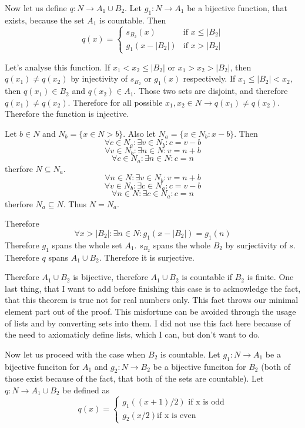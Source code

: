 \documentclass[11pt,oneside,titlepage]{book}
\begin{document}
Now let us define $q: N \to A_1 \cup B_2$. Let $g_1: N \to A_1$ be a bijective
function, that exists, because the set $A_1$ is countable. Then 
\begin{equation}
  q(x)=
  \begin{cases}
    s_{B_2}(x) & \text{if } x \leq |B_2|\\
    g_1(x - |B_2|) & \text{if } x > |B_2|
  \end{cases}
\end{equation}

Let's analyse this function. If $x_1 < x_2 \leq |B_2|$ or $x_1 > x_2 > |B_2|$,
then $q(x_1) \neq q(x_2)$ by injectivity of $s_{B_2}$ or $g_1(x)$ respectively.
If $x_1 \leq |B_2| < x_2$, then $q(x_1) \in B_2$ and $q(x_2) \in A_1$. Those
two sets are disjoint, and therefore $q(x_1) \neq q(x_2)$. Therefore for
all possible $x_1,x_2 \in N \to q(x_1) \neq q(x_2)$. Therefore the function
is injective.

Let $b \in N$ and  $N_b = \{x \in N > b\}$. Also let  $N_a = \{x \in N_b: x -
b\}$. Then
$$\forall c \in N_a: \exists v \in N_b: c = v - b$$
$$\forall v \in N_b: \exists n \in N: v = n + b$$
$$\forall c \in N_a: \exists n \in N: c = n$$
therfore $N \subseteq N_a$.
$$\forall n \in N: \exists v \in N_b: v = n + b$$
$$\forall v \in N_b: \exists c \in N_a: c = v - b$$
$$\forall n \in N: \exists c \in N_a: c = n$$
therfore $N_a \subseteq N$. Thus $N = N_a$.

Therefore
$$\forall x > |B_2|: \exists n \in N: g_1(x - |B_2|) = g_1(n)$$
Therefore $g_1$ spans the whole set $A_1$. $s_{B_2}$ spans the whole $B_2$ by
surjectivity of $s$. Therefore $q$ spans $A_1 \cup B_2$. Therefore it
is surjective.

Therefore $A_1 \cup B_2$ is bijective, therefore $A_1 \cup B_2$ is countable
if $B_2$ is finite. One last thing, that I want to add before finishing this case
is to acknowledge the fact, that this theorem is  true not for
real numbers only. This fact throws our minimal element part out of  the proof.
This misfortune can be avoided through the usage of lists and by converting sets
into them. I did not use this fact here because of the need to axiomaticly
define lists, which I can, but don't want to do. 

Now let us proceed with the case when $B_2$ is countable. Let
$g_1: N \to A_1$ be a bijective funciton for $A_1$
and $g_2: N \to B_2$ be a bijective funciton
for $B_2$ (both of those exist because of the fact, that both of the sets are
countable).  Let $q: N \to A_1 \cup B_2$ be defined as
\begin{equation}
  q(x) =
  \begin{cases}
    g_1((x + 1) /  2) \text{ if x is odd} \\
    g_2(x / 2) \text{if x is even}
  \end{cases}
\end{equation}
\end{document}
